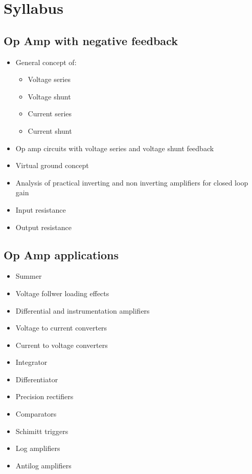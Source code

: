 \documentclass[../course]{subfiles}
\begin{document}
\section{Syllabus}

\subsection{Op Amp with negative feedback}

\begin{itemize}

    \item General concept of:

        \begin{itemize}
            \item Voltage series
            \item Voltage shunt
            \item Current series
            \item Current shunt
        \end{itemize}

    \item Op amp circuits with voltage series and voltage shunt feedback
    \item Virtual ground concept
    \item Analysis of practical inverting and non inverting amplifiers for closed loop gain
    \item Input resistance
    \item Output resistance

\end{itemize}

\subsection{Op Amp applications}

\begin{itemize}

    \item Summer
    \item Voltage follwer loading effects
    \item Differential and instrumentation amplifiers
    \item Voltage to current converters
    \item Current to voltage converters
    \item Integrator
    \item Differentiator
    \item Precision rectifiers
    \item Comparators
    \item Schimitt triggers
    \item Log amplifiers
    \item Antilog amplifiers

\end{itemize}
\end{document}
